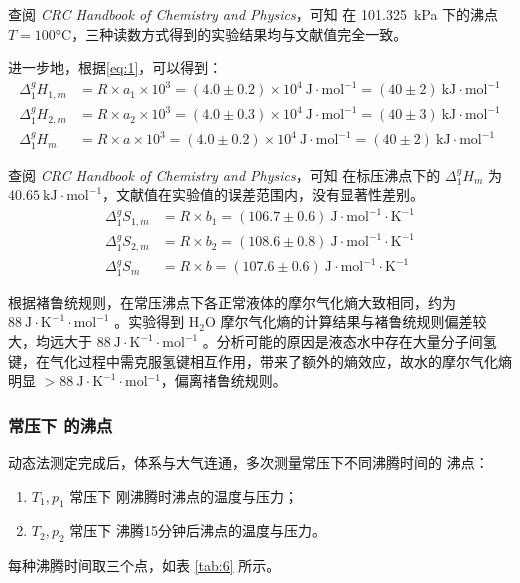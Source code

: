 查阅 \textit{CRC Handbook of Chemistry and Physics}\cite{haynes2016crc}，可知  在 \SI{101.325}{kPa} 下的沸点 $T = 100\si{\celsius}$，三种读数方式得到的实验结果均与文献值完全一致。

进一步地，根据\eqref{eq:1}，可以得到：
\[
\begin{aligned}
    \Delta_1^{g} H_{1,m} &= R\times a_1\times 10^{3} = (4.0\pm0.2)\times10^{4}\mathrm{~J\cdot mol^{-1}} = (40\pm 2)\mathrm{~kJ\cdot mol^{-1}}\\
    \Delta_1^{g} H_{2,m} &= R\times a_2\times 10^{3} = (4.0\pm0.3)\times10^{4}\mathrm{~J\cdot mol^{-1}} = (40\pm 3)\mathrm{~kJ\cdot mol^{-1}}\\
    \Delta_1^{g} H_{m} &= R\times a\times 10^{3} = (4.0\pm0.2)\times10^{4}\mathrm{~J\cdot mol^{-1}} = (40\pm 2)\mathrm{~kJ\cdot mol^{-1}}
\end{aligned}
\]

查阅 \textit{CRC Handbook of Chemistry and Physics}\cite{haynes2016crc}，可知  在标压沸点下的 $\Delta_1^{g} H_m$ 为 $40.65\mathrm{~kJ\cdot mol^{-1}}$，文献值在实验值的误差范围内，没有显著性差别。
\[
\begin{aligned}
    \Delta_1^{g} S_{1,m} &= R\times b_1 = (106.7\pm 0.6)\mathrm{~J\cdot mol^{-1}\cdot K^{-1}}\\
    \Delta_1^{g} S_{2,m} &= R\times b_2 = (108.6\pm 0.8)\mathrm{~J\cdot mol^{-1}\cdot K^{-1}}\\
    \Delta_1^{g} S_m &= R\times b = (107.6\pm 0.6)\mathrm{~J\cdot mol^{-1}\cdot K^{-1}}
\end{aligned}
\]

根据褚鲁统规则，在常压沸点下各正常液体的摩尔气化熵大致相同，约为 $88 \mathrm{~J} \cdot \mathrm{K}^{-1} \cdot \mathrm{mol}^{-1}$ 。实验得到 $\mathrm{H}_2 \mathrm{O}$ 摩尔气化熵的计算结果与褚鲁统规则偏差较大，均远大于 $88 \mathrm{~J} \cdot \mathrm{K}^{-1} \cdot \mathrm{mol}^{-1}$ 。分析可能的原因是液态水中存在大量分子间氢键，在气化过程中需克服氢键相互作用，带来了额外的熵效应，故水的摩尔气化熵明显 $>88 \mathrm{~J} \cdot \mathrm{K}^{-1} \cdot \mathrm{mol}{ }^{-1}$，偏离禇鲁统规则。

\subsubsection{常压下  的沸点}

动态法测定完成后，体系与大气连通，多次测量常压下不同沸腾时间的  沸点：
\begin{enumerate}
    \item $T_1,p_1$ 常压下  刚沸腾时沸点的温度与压力；
    \item $T_2,p_2$ 常压下  沸腾15分钟后沸点的温度与压力。
\end{enumerate}
每种沸腾时间取三个点，如表 \ref{tab:6} 所示。

